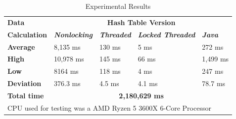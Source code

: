 \documentclass[conference]{IEEEtran}
\begin{document}
\begin{table}[htbp]
    \caption{Experimental Results}
    \begin{center}
    \begin{tabularx}{\columnwidth}{|X|X|X|X|X|}
    \hline
    \textbf{Data}&\multicolumn{4}{|c|}{\textbf{Hash Table Version}} \\
    \cline{2-5} 
    \textbf{Calculation} & \textbf{\textit{Nonlocking}}& \textbf{\textit{Threaded}}& \textbf{\textit{Locked Threaded}}& \textbf{\textit{Java}} \\
    \hline
    \textbf{Average}& 8,135 ms& 130 ms&  5 ms& 272 ms\\
    \hline
    \textbf{High}& 10,978 ms& 145 ms&  66 ms& 1,499 ms\\
    \hline
    \textbf{Low}& 8164 ms& 118 ms&  4 ms& 247 ms\\
    \hline
    \textbf{Deviation}& 376.3 ms& 4.5 ms&  4.1 ms& 78.7 ms\\
    \hline
    \textbf{Total time}&\multicolumn{4}{|c|}{\textbf{2,180,629 ms}} \\
    \hline
    \multicolumn{5}{l}{CPU used for testing was a AMD Ryzen 5 3600X 6-Core Processor}
    \end{tabularx}
    \label{tab1}
    \end{center}
\end{table}
\end{document}
